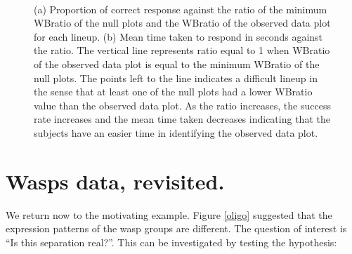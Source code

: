 \begin{figure}[htbp]
\centering
\mbox{\quad
{}}
\caption{(a) Proportion of correct response against the ratio of the minimum WBratio of the null plots and the WBratio of the observed data plot for each lineup. (b) Mean time taken to respond in seconds against the ratio.  The vertical line represents ratio equal to 1 when WBratio of the observed data plot is equal to the minimum WBratio of the null plots. The points left to the line indicates a difficult lineup in the sense that at least one of the null plots had a lower WBratio value than the observed data plot. As the ratio increases, the success rate increases and the mean time taken decreases indicating that the subjects have an easier time in identifying the observed data plot. } 
\label{null}
\end{figure}

\section{Wasps data, revisited. }

We return now to the motivating example. Figure \ref{oligo} suggested that the expression patterns of the wasp groups are different.  The question of interest is ``Is this separation real?''. This can be investigated by testing the hypothesis: 


